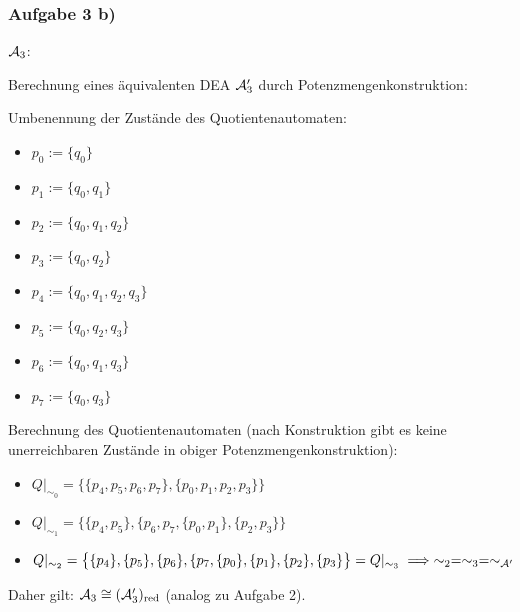 \subsubsection{Aufgabe 3 b)}
$\mathcal{A}_3$:\\
\usetikzlibrary{positioning,automata}

Berechnung eines äquivalenten DEA $\mathcal{A}_3'$ durch Potenzmengenkonstruktion:

Umbenennung der Zustände des Quotientenautomaten:
\begin{itemize}
	\item $p_0:=\lbrace q_0\rbrace$
	\item $p_1:=\lbrace q_0,q_1\rbrace$
	\item $p_2:=\lbrace q_0,q_1,q_2\rbrace$
	\item $p_3:=\lbrace q_0,q_2\rbrace$
	\item $p_4:=\lbrace q_0,q_1,q_2,q_3\rbrace$
	\item $p_5:=\lbrace q_0,q_2,q_3\rbrace$
	\item $p_6:=\lbrace q_0,q_1,q_3\rbrace$
	\item $p_7:=\lbrace q_0,q_3\rbrace$
\end{itemize}

Berechnung des Quotientenautomaten (nach Konstruktion gibt es keine unerreichbaren Zustände in obiger Potenzmengenkonstruktion):
\begin{itemize}
	\item $Q|_{\sim_0}=\big\lbrace\lbrace p_4,p_5,p_6,p_7\rbrace,\lbrace p_0,p_1,p_2,p_3\rbrace\big\rbrace$
	\item $Q|_{\sim_1}=\big\lbrace\lbrace p_4,p_5\rbrace,\lbrace p_6,p_7,\lbrace p_0,p_1\rbrace,\lbrace p_2,p_3\rbrace\big\rbrace$
	\item $Q|_{\sim_2}=\big\lbrace\lbrace p_4\rbrace,\lbrace p_5\rbrace,\lbrace p_6\rbrace,\lbrace p_7,\lbrace p_0\rbrace,\lbrace p_1\rbrace,\lbrace p_2\rbrace,\lbrace p_3\rbrace\big\rbrace=Q|_{\sim_3}\implies\sim_2=\sim_3=\sim_{\mathcal{A}'}$
\end{itemize}
Daher gilt: $\mathcal{A}_3\cong(\mathcal{A}_3')_{\text{red}}$ (analog zu Aufgabe 2).

